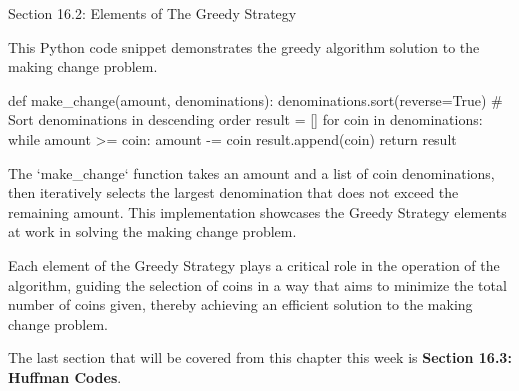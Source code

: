 \begin{notes}{Section 16.2: Elements of The Greedy Strategy}
    \begin{highlight}
        This Python code snippet demonstrates the greedy algorithm solution to the making change problem.
    
    \begin{code}[Python]
    def make_change(amount, denominations):
        denominations.sort(reverse=True)  # Sort denominations in descending order
        result = []
        for coin in denominations:
            while amount >= coin:
                amount -= coin
                result.append(coin)
        return result
    \end{code}
    
        The `make\_change` function takes an amount and a list of coin denominations, then iteratively selects the largest denomination that does not exceed the remaining amount. This implementation 
        showcases the Greedy Strategy elements at work in solving the making change problem.
    \end{highlight}
    
    Each element of the Greedy Strategy plays a critical role in the operation of the algorithm, guiding the selection of coins in a way that aims to minimize the total number of coins given, thereby 
    achieving an efficient solution to the making change problem.    
\end{notes}

The last section that will be covered from this chapter this week is \textbf{Section 16.3: Huffman Codes}.

